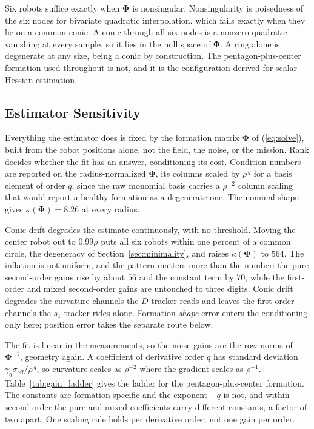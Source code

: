 \documentclass[lettersize,journal]{IEEEtran}
\begin{document}
Six robots suffice exactly when $\boldsymbol{\Phi}$ is nonsingular.
Nonsingularity is poisedness of the six nodes for bivariate quadratic interpolation, which fails exactly when they lie on a common conic. A conic through all six nodes is a nonzero quadratic vanishing at every sample, so it lies in the null space of $\boldsymbol{\Phi}$. A ring
alone is degenerate at any size, being a conic by construction. The
pentagon-plus-center formation used throughout is not, and it is the
configuration \cite{4} derived for scalar Hessian estimation.

\subsection{Estimator Sensitivity}
\label{sec:sensitivity}

Everything the estimator does is fixed by the formation matrix
$\boldsymbol{\Phi}$ of (\ref{eq:solve}), built from the robot positions
alone, not the field, the noise, or the mission. Rank decides whether the fit has an answer, conditioning its cost. Condition numbers are
reported on
the radius-normalized $\boldsymbol{\Phi}$, its columns scaled by
$\rho^{\,q}$ for a basis element of order $q$, since the raw monomial
basis carries a $\rho^{-2}$ column scaling that would report a healthy
formation as a degenerate one. The nominal shape gives
$\kappa(\boldsymbol{\Phi}) = 8.26$ at every radius.

Conic drift degrades the estimate continuously, with no threshold.
Moving the center robot out to $0.99\rho$ puts all
six robots within one percent of a common circle, the degeneracy of
Section~\ref{sec:minimality}, and raises $\kappa(\boldsymbol{\Phi})$ to
$564$. The inflation is not uniform, and the pattern matters more than the number: the pure second-order gains rise by about $56$ and the
constant term by $70$, while the first-order and mixed second-order
gains are untouched to three digits. Conic drift degrades the curvature
channels the $D$ tracker reads and leaves the first-order channels the
$s_1$ tracker rides alone. Formation \emph{shape} error enters the
conditioning only here; position error takes the separate route below.

The fit is linear in the measurements, so the noise gains are the row
norms of $\boldsymbol{\Phi}^{-1}$, geometry again. A coefficient of
derivative order $q$ has standard deviation $\gamma_q
\sigma_{\mathrm{eff}} / \rho^{\,q}$, so curvature scales as $\rho^{-2}$
where the gradient scales as $\rho^{-1}$. Table~\ref{tab:gain_ladder} gives
the ladder for the pentagon-plus-center formation. The constants are
formation specific and the exponent $-q$ is not, and within second
order the pure and mixed coefficients carry different constants, a
factor of two apart. One scaling rule holds per derivative order, not
one gain per order.
\end{document}
